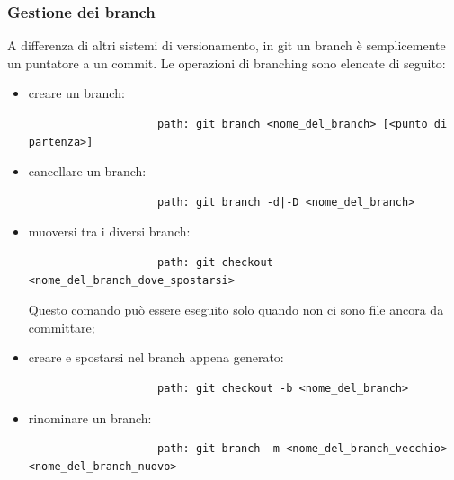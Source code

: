 		
		\subsubsection{Gestione dei branch} %
		\label{ssub:gestione_dei_branch_locale}
		A differenza di altri sistemi di versionamento, in git un branch è semplicemente un puntatore a un commit. \newline
		Le operazioni di branching sono elencate di seguito:
			\begin{itemize}
				\item creare un branch:
					\begin{verbatim}
					path: git branch <nome_del_branch> [<punto di partenza>]
					\end{verbatim}
				\item cancellare un branch:
					\begin{verbatim}
					path: git branch -d|-D <nome_del_branch>
					\end{verbatim}
				\item muoversi tra i diversi branch:
					\begin{verbatim}
					path: git checkout <nome_del_branch_dove_spostarsi>
					\end{verbatim}
				Questo comando può essere eseguito solo quando non ci sono file ancora da committare;
				\item creare e spostarsi nel branch appena generato:
					\begin{verbatim}
					path: git checkout -b <nome_del_branch>
					\end{verbatim}
				\item rinominare un branch:
					\begin{verbatim}
					path: git branch -m <nome_del_branch_vecchio> <nome_del_branch_nuovo>
					\end{verbatim}
			\end{itemize}
			\noindent
		
